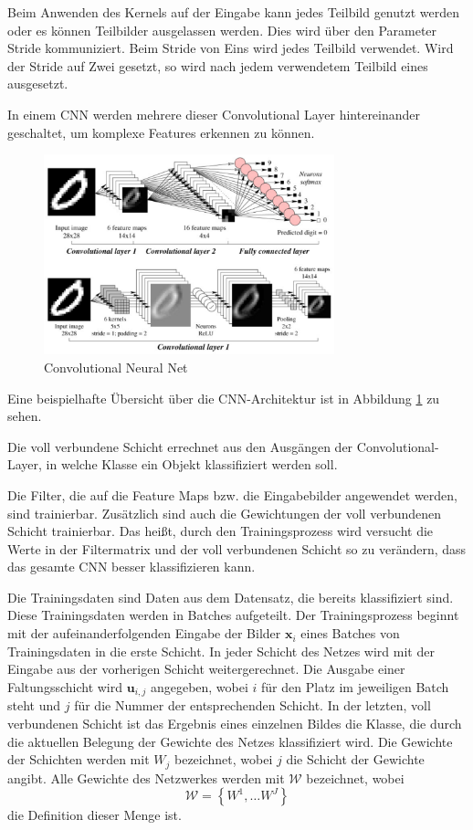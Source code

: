 Beim Anwenden des Kernels auf der Eingabe kann jedes Teilbild genutzt werden oder es können Teilbilder ausgelassen werden. Dies wird über den Parameter Stride kommuniziert. Beim Stride von Eins wird jedes Teilbild verwendet. Wird der Stride auf Zwei gesetzt, so wird nach jedem verwendetem Teilbild eines ausgesetzt.


In einem CNN werden mehrere dieser Convolutional Layer hintereinander geschaltet, um komplexe Features erkennen zu können. 
\begin{figure}[H]
  \centering
  \includegraphics[width=0.75\textwidth]{images/cnn.pdf}
  \caption{Convolutional Neural Net \cite{CNNImg}}
  \label{fig:cnn}
\end{figure}



Eine beispielhafte Übersicht über die CNN-Architektur ist in Abbildung \ref{fig:cnn} zu sehen.

Die voll verbundene Schicht errechnet aus den Ausgängen der Convolutional-Layer, in welche Klasse ein Objekt klassifiziert werden soll.

Die Filter, die auf die Feature Maps bzw. die Eingabebilder angewendet werden, sind trainierbar. Zusätzlich sind auch die Gewichtungen der voll verbundenen Schicht trainierbar. Das heißt, durch den Trainingsprozess wird versucht die Werte in der Filtermatrix und der voll verbundenen Schicht so zu verändern, dass das gesamte CNN besser klassifizieren kann. 



Die Trainingsdaten sind Daten aus dem Datensatz, die bereits klassifiziert sind. Diese Trainingsdaten werden in Batches aufgeteilt. Der Trainingsprozess beginnt mit der aufeinanderfolgenden Eingabe der Bilder $\mathbf{x}_i$ eines Batches von Trainingsdaten in die erste Schicht. In jeder Schicht des Netzes wird mit der Eingabe aus der vorherigen Schicht weitergerechnet. Die Ausgabe einer Faltungsschicht wird $\mathbf{u}_{i,j}$ angegeben, wobei $i$ für den Platz im jeweiligen Batch steht und $j$ für die Nummer der entsprechenden Schicht. In der letzten, voll verbundenen Schicht ist das Ergebnis eines einzelnen Bildes die Klasse, die durch die aktuellen Belegung der Gewichte des Netzes klassifiziert wird. Die Gewichte der Schichten werden mit $W_{j}$ bezeichnet, wobei $j$ die Schicht der Gewichte angibt. Alle Gewichte des Netzwerkes werden mit $\mathcal{W}$ bezeichnet, wobei 
\begin{equation}
\mathcal{W}=\left\{ W^{1}, \ldots W^{J} \right\}
\end{equation}
die Definition dieser Menge ist.

